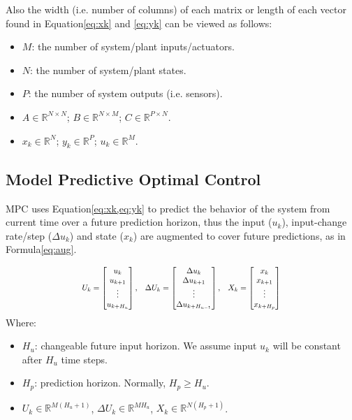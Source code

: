 Also the width (i.e. number of columns) of each matrix or length of each vector found in Equation\cref{eq:xk} and \cref{eq:yk} can be viewed as follows:
\begin{itemize}
  \item $M$: the number of system/plant inputs/actuators.
  \item $N$: the number of system/plant states.
  \item $P$: the number of system outputs (i.e. sensors). 
  \item $A \in \mathbb{R}^{N\times N}$; $B \in \mathbb{R}^{N\times M}$; $C \in \mathbb{R}^{P\times N}$.
  \item $x_{k} \in \mathbb{R}^{N}$; $y_k \in \mathbb{R}^{P}$; $u_k \in \mathbb{R}^{M}$.
\end{itemize}


\subsection{Model Predictive Optimal Control}
MPC uses Equation\cref{eq:xk,eq:yk} to predict the behavior of the system from current time over a future prediction horizon, thus the input ($u_k$), input-change rate/step ($\Delta u_k$) and state ($x_k$) are augmented to cover future predictions, as in Formula\cref{eq:aug}.

\begin{equation}
\scalemath{0.8}{
U_k=
\begin{bmatrix}
u_k\\
u_{k+1}\\
\vdots \\
u_{k+H_u}
\end{bmatrix}
\text{,}\quad
\Delta U_k=
\begin{bmatrix}
\Delta u_k\\
\Delta u_{k+1}\\
\vdots \\
\Delta u_{k+H_{u-1}}
\end{bmatrix}
\text{,}\quad
X_k=
\begin{bmatrix}
x_k\\
x_{k+1}\\
\vdots \\
x_{k+H_p}
\end{bmatrix}\label{eq:aug}}
\end{equation}
Where:
\begin{itemize}
	\item $H_u$: changeable future input horizon. We assume input $u_k$ will be constant after $H_u$ time steps.
	\item $H_p$: prediction horizon. Normally, $H_p\geq H_u$. 
	\item $U_k \in \mathbb{R}^{M(H_{u}+1)}$, $\Delta U_k \in \mathbb{R}^{MH_{u}}$, $X_k \in \mathbb{R}^{N(H_{p}+1)}$.
\end{itemize}\par
